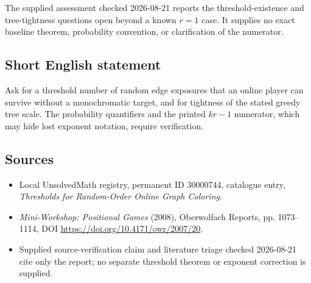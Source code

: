 \documentclass[11pt]{article}
\begin{document}
The supplied assessment checked 2026-08-21 reports the threshold-existence and tree-tightness questions open beyond a known \(r=1\) case. It supplies no exact baseline theorem, probability convention, or clarification of the numerator.
\subsection{Short English statement}
Ask for a threshold number of random edge exposures that an online player can survive without a monochromatic target, and for tightness of the stated greedy tree scale. The probability quantifiers and the printed \(kr-1\) numerator, which may hide lost exponent notation, require verification.
\subsection{Sources}
\begin{itemize}
\item Local UnsolvedMath registry, permanent ID 30000744, catalogue entry, \emph{Thresholds for Random-Order Online Graph Coloring}.
\item \emph{Mini-Workshop: Positional Games} (2008), Oberwolfach Reports, pp. 1073--1114, DOI \url{https://doi.org/10.4171/owr/2007/20}.
\item Supplied source-verification claim and literature triage checked 2026-08-21 cite only the report; no separate threshold theorem or exponent correction is supplied.
\end{itemize}
\end{document}
